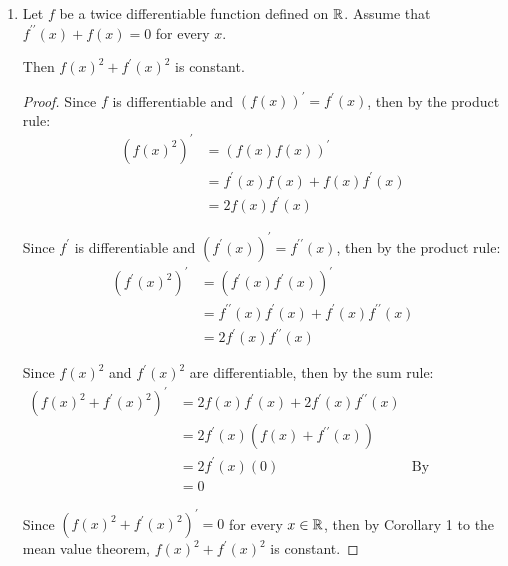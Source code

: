 \documentclass[12pt, letterpaper]{article}
\begin{document}
\begin{enumerate}[label=\bfseries3\alph*)]

\item Let $f$ be a twice differentiable function defined on $\mathbb{R}$. Assume that 
$f^{\prime\prime}(x) + f(x) = 0$ for every $x$. 

Then $f(x)^2 + f^\prime(x)^2$ is constant.

\begin{proof}
    Since $f$ is differentiable and $(f(x))^\prime = f^\prime(x)$, then by
    the product rule:
    \begin{align*} 
        (f(x)^2)^\prime &= (f(x)f(x))^\prime \\
                        &= f^\prime(x)f(x) + f(x)f^\prime(x) \\
                        &= 2f(x)f^\prime(x)
    \end{align*}

    Since $f^\prime$ is differentiable and 
    $(f^\prime(x))^\prime = f^{\prime\prime}(x)$, then by the product rule:
    \begin{align*} 
        (f^\prime(x)^2)^\prime &= (f^\prime(x)f^\prime(x))^\prime \\
                               &= f^{\prime\prime}(x)f^\prime(x) + f^\prime(x)f^{\prime\prime}(x) \\
                               &= 2f^\prime(x)f^{\prime\prime}(x)
    \end{align*}

    Since $f(x)^2$ and $f^\prime(x)^2$ are differentiable, then by the sum rule:
    \begin{align*}
        (f(x)^2 + f^\prime(x)^2)^\prime &= 2f(x)f^\prime(x) + 2f^\prime(x)f^{\prime\prime}(x) \\
                                        &= 2f^\prime(x)(f(x) + f^{\prime\prime}(x)) \\
                                        &= 2f^\prime(x)(0)  &\text{By hypothesis}  \\
                                        &= 0 
    \end{align*}

    Since $(f(x)^2 + f^\prime(x)^2)^\prime = 0$ for every $x \in \mathbb{R}$, then by
    Corollary 1 to the mean value theorem, $f(x)^2 + f^\prime(x)^2$ is constant.
\end{proof}



\end{enumerate}
\end{document}
